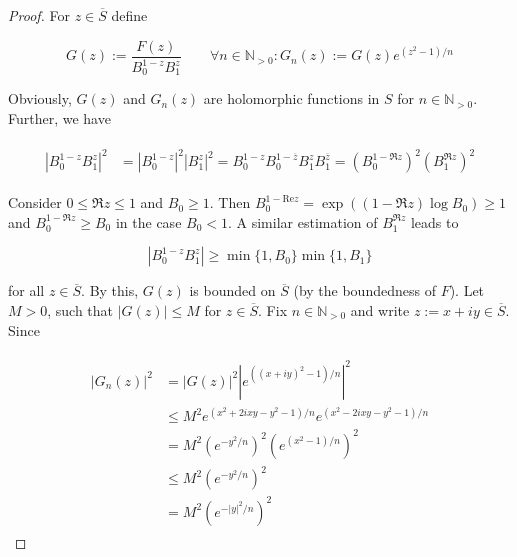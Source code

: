 \begin{proof}
	For $z \in \overline{S}$ define 

\begin{equation}
	G(z) := \frac{F(z)}{B_0^{1 - z}B_1^z} \qquad \forall n \in \mathbb{N}_{>0}: G_n(z) := G(z) e^{(z^2 - 1)/n} 
\end{equation}

	Obviously, $G(z)$ and $G_n(z)$ are holomorphic functions in $S$ for $n \in \mathbb{N}_{>0}$. Further, we have

\begin{gather}
	\begin{aligned}
		\left| B_0^{1 - z}B_1^z \right|^2 &= \left| B_0^{1 - z}\right|^2 \left| B_1^z \right|^2 = B_0^{1 - z}B_0^{1 - \overline{z}} B_1^z B_1^{\overline{z}} = \left( B_0^{1 -\Re z} \right)^2 \left( B_1^{\Re z} \right)^2 
	\end{aligned}
\end{gather}

	Consider $0 \leqslant \Re z \leqslant 1$ and $B_0 \geqslant 1$. Then  $B_0^{1 - \mathrm{Re}z} = \exp\left((1 - \Re z ) \log B_0\right) \geqslant 1$ and $B_0^{1 - \Re z } \geqslant B_0$ in the case $B_0 < 1$. A similar estimation of $B_1^{\Re z}$ leads to 

\begin{equation}
	\left| B_0^{1 - z}B_1^z \right| \geqslant \min\{1,B_0\}\min\{1,B_1\}
\end{equation}

	for all $z \in \overline{S}$. By this, $G(z)$ is bounded on $\overline{S}$ (by the boundedness of $F$). Let $M > 0$, such that $\left| G(z) \right| \leqslant M$ for $z \in \overline{S}$. Fix $n \in \mathbb{N}_{>0}$ and write $z := x + iy \in \overline{S}$. Since

\begin{gather}
	\begin{aligned}
	\left| G_n(z)\right|^2 &= \left| G(z) \right|^2 \left| e^{((x + iy)^2 - 1)/n} \right|^2\\
	& \leqslant M^2 e^{(x^2 + 2ixy -y^2 - 1)/n} e^{(x^2 - 2ixy -y^2 - 1)/n}\\
	&= M^2 \left( e^{-y^2/n} \right)^2 \left(e^{(x^2 - 1)/n}\right)^2\\
	&\leqslant M^2 \left(e^{-y^2/n}\right)^2\\
	&= M^2 \left( e^{-\left| y \right|^2/n} \right)^2
	\end{aligned}
\end{gather}


\end{proof}
